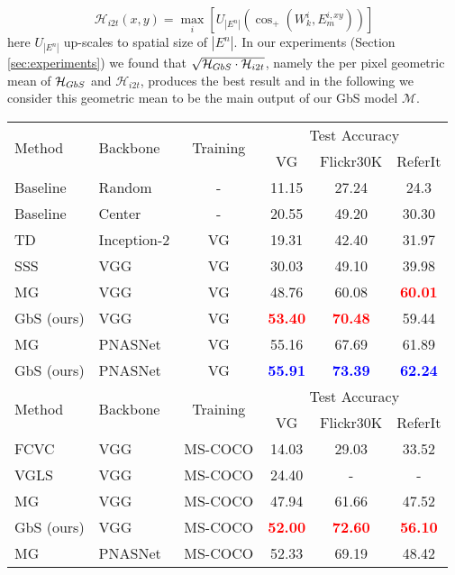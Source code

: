 \documentclass[10pt,twocolumn,letterpaper]{article}
\def\oursspace{{GbS }}
\begin{document}
\begin{equation}
    \mathcal{H}_{i2t}\left(x,y\right) =\max_{i}\left[U_{|E^n|}\left(\cos_+\left(W_k^i, E_m^{i,xy}\right)\right)\right]
\end{equation}
here $U_{|E^n|}$ up-scales to spatial size of $|E^n|$. In our experiments (Section \ref{sec:experiments}) we found that $\sqrt{\mathcal{H}_{{GbS}} \cdot \mathcal{H}_{i2t}}$, namely the per pixel geometric mean of $\mathcal{H}_{{GbS}}$ and $\mathcal{H}_{i2t}$, produces the best result and in the following we consider this geometric mean to be the main output of our \oursspace model $\mathcal{M}$.








\begin{table*}[t]
\begin{center}
\begin{tabular}{ llcccc }
\toprule
 \multirow{2}{*}{Method} & \multirow{2}{*}{Backbone} & \multirow{2}{*}{Training} & \multicolumn{3}{c}{ Test Accuracy}\\


  &  &  & VG & Flickr30K & ReferIt\\ 
 \midrule
 Baseline & Random & - & 11.15 & 27.24 & 24.3 \\  
 Baseline & Center & - & 20.55 & 49.20 & 30.30 \\
 \midrule
 TD \cite{zhang2018top} & Inception-2 & VG & 19.31 & 42.40 & 31.97 \\
 SSS \cite{javed2018learning} & VGG & VG & 30.03 & 49.10 & 39.98 \\
 MG \cite{akbari2019multi} & VGG & VG & 48.76 & 60.08 & \textcolor{red}{\textbf{60.01}} \\
 \oursspace  (ours) & VGG & VG & \textcolor{red}{\textbf{53.40}} & \textcolor{red}{\textbf{70.48}} & 59.44\\
 \midrule
 MG \cite{akbari2019multi} & PNASNet & VG & 55.16 & 67.69 & 61.89 \\
\oursspace (ours) & PNASNet & VG &\textcolor{blue}{\textbf{55.91}}& \textcolor{blue}{\textbf{73.39}} & \textcolor{blue}{\textbf{62.24}}\\
 \midrule
  \midrule
 \multirow{2}{*}{Method} & \multirow{2}{*}{Backbone} & \multirow{2}{*}{Training} & \multicolumn{3}{c}{ Test Accuracy}\\
 &  &  & VG & Flickr30K & ReferIt\\ 
 \midrule
 FCVC \cite{fang2015captions} & VGG & MS-COCO & 14.03 & 29.03 & 33.52 \\
 VGLS \cite{xiao2017weakly} & VGG &  MS-COCO & 24.40 & - & - \\
 MG \cite{akbari2019multi} & VGG &  MS-COCO & 47.94 & 61.66 & 47.52 \\
 \oursspace  (ours) & VGG &  MS-COCO & \textcolor{red}{\textbf{52.00}} & \textcolor{red}{\textbf{72.60}} & \textcolor{red}{\textbf{56.10}} \\
 \midrule
 MG \cite{akbari2019multi} & PNASNet &  MS-COCO & 52.33 & 69.19 & 48.42 \\



\end{tabular}
\end{center}
\end{table*}
\end{document}
